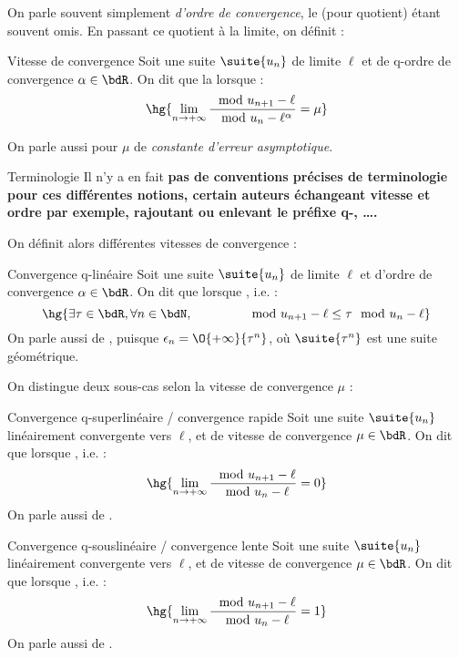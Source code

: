 \documentclass[a4paper,french,bookmarks]{article}
\begin{document}
On parle souvent simplement \textit{d'ordre de convergence}, le  (pour quotient) étant souvent omis. En passant ce quotient à la limite, on définit :
%
\begin{definition}{Vitesse de convergence}{}
    Soit une suite $\suite{u_n}$ de limite $\ell$ et de q-ordre de convergence $\alpha \in \bdR$. On dit que la  lorsque :
    \[ \hg{\lim\limits_{n \to+\infty} \dfrac{\mod{u_{n+1} - \ell}}{\mod{u_n - \ell}^\alpha} = \mu}\]
\end{definition}

On parle aussi pour $\mu$ de \textit{constante d'erreur asymptotique}. 

\begin{warning}{Terminologie}{}
    Il n'y a en fait \bf{pas de conventions précises de terminologie pour ces différentes notions}, certain auteurs échangeant vitesse et ordre par exemple, rajoutant ou enlevant le préfixe q-, \dots.
\end{warning}

On définit alors différentes vitesses de convergence :

\begin{definition}{Convergence q-linéaire}{}
    Soit une suite $\suite{u_n}$ de limite $\ell$ et d'ordre de convergence $\alpha \in \bdR$. On dit que  lorsque , i.e. :
    \[ \hg{\exists \tau \in \bdR,\forall n \in \bdN,\qquad \qquad \mod{u_{n+1} - \ell} \leq \tau\mod{u_n - \ell}}\]
    On parle aussi de , puisque $\epsilon_n = \O{+\infty}{\tau^n}$, où $\suite{\tau^n}$ est une suite géométrique.
\end{definition}

On distingue deux sous-cas selon la vitesse de convergence $\mu$ :

\begin{definition}{Convergence q-superlinéaire / convergence rapide}{}
    Soit une suite $\suite{u_n}$ linéairement convergente vers $\ell$, et de vitesse de convergence $\mu \in \bdR$. On dit que  lorsque , i.e. :
    \[ \hg{\lim\limits_{n \to+\infty} \dfrac{\mod{u_{n+1} - \ell}}{\mod{u_n - \ell}} = 0}\]
    On parle aussi de .
\end{definition}

\begin{definition}{Convergence q-souslinéaire / convergence lente}{}
    Soit une suite $\suite{u_n}$ linéairement convergente vers $\ell$, et de vitesse de convergence $\mu \in \bdR$. On dit que  lorsque , i.e. :
    \[ \hg{\lim\limits_{n \to+\infty} \dfrac{\mod{u_{n+1} - \ell}}{\mod{u_n - \ell}} = 1}\]
    On parle aussi de .
\end{definition}
\end{document}
